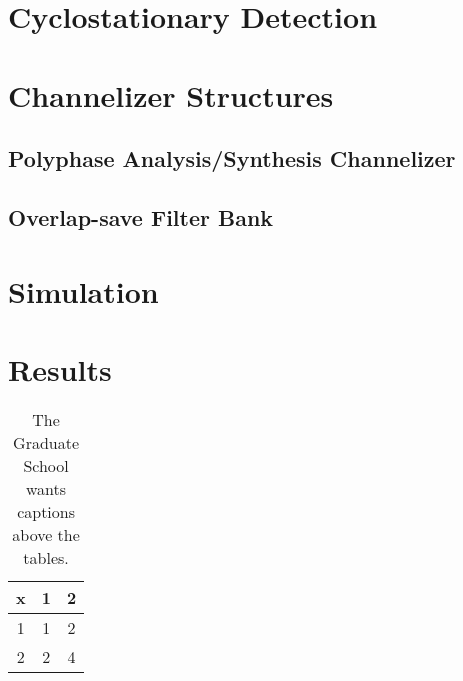 \documentclass[12pt,dvips]{report}
\begin{document}
\chapter{Cyclostationary Detection}
\label{sec:cyclo}

\chapter{Channelizer Structures}
\label{sec:chan}
\section{Polyphase Analysis/Synthesis Channelizer}
\label{sec:poly_chan}

\section{Overlap-save Filter Bank}
\label{sec:filter_bank}

\chapter{Simulation}
\label{sec:sim}

\chapter{Results}
\label{sec:results}

%
%

%

 \begin{table}
 \caption{The Graduate School wants captions above the tables.}
\begin{center}
 \begin{tabular}{ccc}
 x & 1 & 2 \\ \hline
 1 & 1 & 2 \\
 2 & 2 & 4 \\ \hline
 \end{tabular}
\end{center}
 \end{table}
\end{document}
